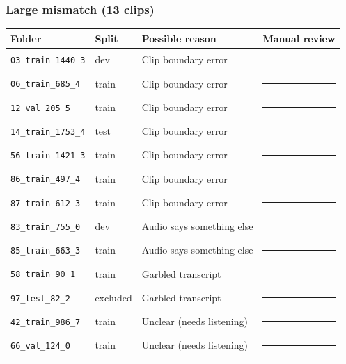 \documentclass[11pt]{article}
\begin{document}
\subsubsection*{Large mismatch (13 clips)}
\begin{center}\begin{tabular}{@{}p{} p{} p{} p{}@{}}
\toprule
\textbf{Folder} & \textbf{Split} & \textbf{Possible reason} & \textbf{Manual review}\\
\midrule
\texttt{03\_train\_1440\_3} & dev & Clip boundary error & \rule{0.28\textwidth}{0.4pt}\\
\texttt{06\_train\_685\_4} & train & Clip boundary error & \rule{0.28\textwidth}{0.4pt}\\
\texttt{12\_val\_205\_5} & train & Clip boundary error & \rule{0.28\textwidth}{0.4pt}\\
\texttt{14\_train\_1753\_4} & test & Clip boundary error & \rule{0.28\textwidth}{0.4pt}\\
\texttt{56\_train\_1421\_3} & train & Clip boundary error & \rule{0.28\textwidth}{0.4pt}\\
\texttt{86\_train\_497\_4} & train & Clip boundary error & \rule{0.28\textwidth}{0.4pt}\\
\texttt{87\_train\_612\_3} & train & Clip boundary error & \rule{0.28\textwidth}{0.4pt}\\
\texttt{83\_train\_755\_0} & dev & Audio says something else & \rule{0.28\textwidth}{0.4pt}\\
\texttt{85\_train\_663\_3} & train & Audio says something else & \rule{0.28\textwidth}{0.4pt}\\
\texttt{58\_train\_90\_1} & train & Garbled transcript & \rule{0.28\textwidth}{0.4pt}\\
\texttt{97\_test\_82\_2} & excluded & Garbled transcript & \rule{0.28\textwidth}{0.4pt}\\
\texttt{42\_train\_986\_7} & train & Unclear (needs listening) & \rule{0.28\textwidth}{0.4pt}\\
\texttt{66\_val\_124\_0} & train & Unclear (needs listening) & \rule{0.28\textwidth}{0.4pt}\\
\bottomrule\end{tabular}\end{center}
\end{document}
